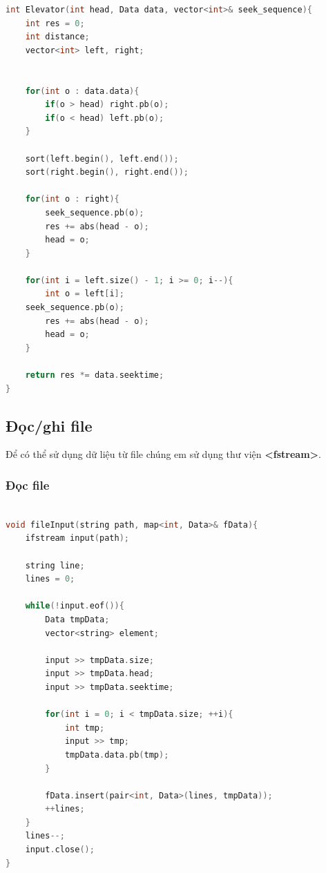 \documentclass{report}
\begin{document}
            \begin{lstlisting}[language=C++, caption = Elevator Implementation]
int Elevator(int head, Data data, vector<int>& seek_sequence){
    int res = 0;
    int distance;
    vector<int> left, right;


    for(int o : data.data){
        if(o > head) right.pb(o);
        if(o < head) left.pb(o);
    }

    sort(left.begin(), left.end());
    sort(right.begin(), right.end());

    for(int o : right){
        seek_sequence.pb(o);
        res += abs(head - o);
        head = o;
    }

    for(int i = left.size() - 1; i >= 0; i--){
        int o = left[i];
	seek_sequence.pb(o);
        res += abs(head - o);
        head = o;
    }

    return res *= data.seektime;
}

            \end{lstlisting}

        \subsection{Đọc/ghi file}
            Để có thể sử dụng dữ liệu từ file chúng em sử dụng thư viện \textbf{<fstream>}.

            \subsubsection{Đọc file}
                \begin{lstlisting}[language=C++, caption=File Reading]

void fileInput(string path, map<int, Data>& fData){
    ifstream input(path);
    
    string line;
    lines = 0;

    while(!input.eof()){
        Data tmpData;
        vector<string> element;
        
        input >> tmpData.size;
        input >> tmpData.head;
        input >> tmpData.seektime;

        for(int i = 0; i < tmpData.size; ++i){
            int tmp;
            input >> tmp;
            tmpData.data.pb(tmp);
        }
        
        fData.insert(pair<int, Data>(lines, tmpData));
        ++lines;
    }
    lines--;	
    input.close();
}
    
                \end{lstlisting}
\end{document}

